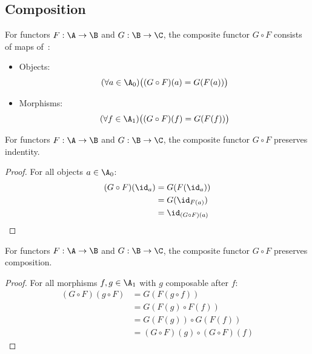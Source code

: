 \subsection{Composition}

\begin{definition}\label{def:functor_composition}

  For functors $F:\A\to \B$ and $G:\B\to \C$, the composite functor $G\circ F$
  consists of maps of~\parencite[p.~17]{leinster:basic_category_theory}:
  \begin{itemize}
    \item Objects:
      \[(\forall a \in \A_0)
        \big((G\circ F)(a) = G(F(a))\big)\]
    \item Morphisms:
      \[(\forall f\in \A_1)
        \big((G\circ F)(f) = G(F(f))\big)\]
  \end{itemize}
\end{definition}

\begin{theorem}
  For functors $F:\A\to \B$ and $G:\B\to \C$, the composite functor $G\circ F$
  preserves indentity.

  \begin{proof}
    For all objects $a\in \A_0$:
    \[
      \begin{aligned}
        (G\circ F)(\id_a)
        &= G(F(\id_a))\\
        &= G(\id_{F(a)})\\
        &= \id_{(G\circ F)(a)}
      \end{aligned}
    \]
  \end{proof}
\end{theorem}

\begin{theorem}
  For functors $F:\A\to \B$ and $G:\B\to \C$, the composite functor $G\circ F$
  preserves composition.

  \begin{proof}
    For all morphisms $f,g\in \A_1$ with $g$ composable after $f$:
    \[
      \begin{aligned}
        (G\circ F)(g\circ F)
        &= G(F(g\circ f))\\
        &= G(F(g)\circ F(f))\\
        &= G(F(g))\circ G(F(f))\\
        &= (G\circ F)(g)\circ(G\circ F)(f)
      \end{aligned}
    \]
  \end{proof}
\end{theorem}

